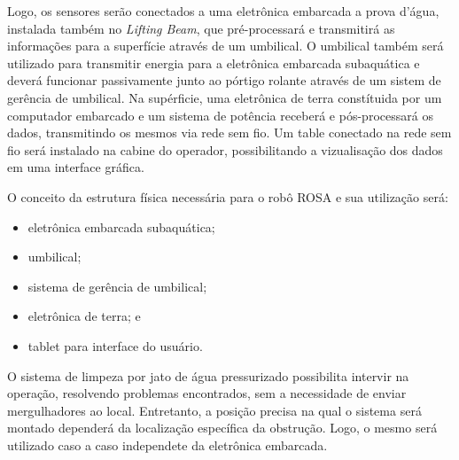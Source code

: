 Logo, os sensores serão conectados a uma eletrônica embarcada a prova d'água,
instalada também no \emph{Lifting Beam}, que pré-processará e transmitirá as
informações para a superfície através de um umbilical. 
O umbilical também será utilizado para transmitir energia para a eletrônica embarcada subaquática e deverá funcionar passivamente junto ao pórtigo rolante através de um sistem de gerência de umbilical. 
Na supérficie, uma eletrônica de terra constítuida por um computador embarcado e um sistema de potência receberá e pós-processará os dados, transmitindo os mesmos via rede sem fio. 
Um table conectado na rede sem fio será instalado na cabine do operador, possibilitando a vizualisação dos dados em uma interface gráfica.

O conceito da estrutura física necessária para o robô ROSA e sua utilização será: 

\begin{itemize}

	\item eletrônica embarcada subaquática; 
	\item umbilical;
	\item sistema de gerência de umbilical;
	\item eletrônica de terra; e
	\item tablet para interface do usuário. 

\end{itemize}

O sistema de limpeza por jato de água pressurizado possibilita intervir na
operação, resolvendo problemas encontrados, sem a necessidade de enviar
mergulhadores ao local. Entretanto, a posição precisa na qual o sistema será
montado dependerá da localização específica da obstrução. Logo, o mesmo será utilizado caso a caso independete da eletrônica embarcada.


